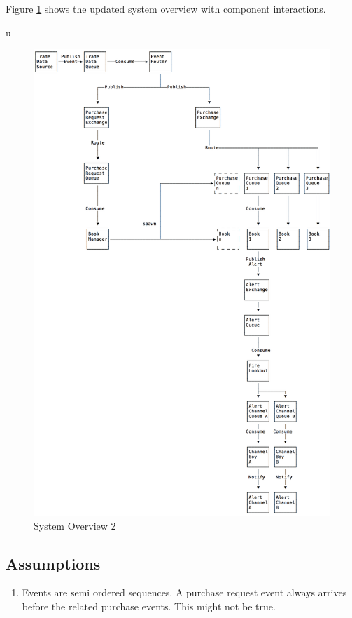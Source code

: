 \documentclass[captions=tableheading]{scrreprt}
\begin{document}
Figure \ref{fig:orgparagraph5} shows the updated system overview with component
interactions.

u\begin{figure}[htb]
\centering
\includegraphics[width=.9\linewidth]{system-overview-2.png}
\caption{\label{fig:orgparagraph5}
System Overview 2}
\end{figure}

\subsection{Assumptions}
\label{sec:orgheadline15}
\begin{enumerate}
\item Events are semi ordered sequences. A purchase request event always
arrives before the related purchase events. This might not be true.
\end{enumerate}
\end{document}
